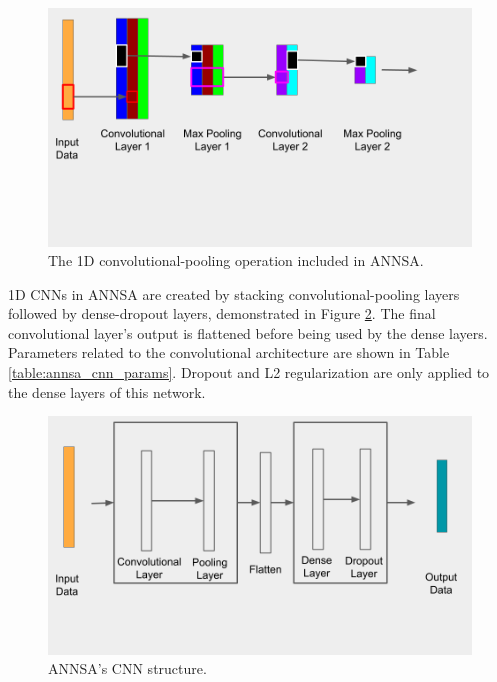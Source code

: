 \begin{figure}[H]
\centering
\includegraphics[trim=0 150 60 0,clip,width=0.8\linewidth]{images/annsa_cnn_fine.png}
\caption{The 1D convolutional-pooling operation included in ANNSA.}
\label{fig:annsa_cnn_fine}
\end{figure}

1D CNNs in ANNSA are created by stacking convolutional-pooling layers followed by dense-dropout layers, demonstrated in Figure \ref{fig:annsa_cnn}. The final convolutional layer's output is flattened before being used by the dense layers. Parameters related to the convolutional architecture are shown in Table \ref{table:annsa_cnn_params}. Dropout and L2 regularization are only applied to the dense layers of this network.

\begin{figure}[H]
\centering
\includegraphics[trim=0 75 20 0,clip,width=0.8\linewidth]{images/annsa_cnn.png}
\caption{ANNSA's CNN structure.}
\label{fig:annsa_cnn}
\end{figure}

